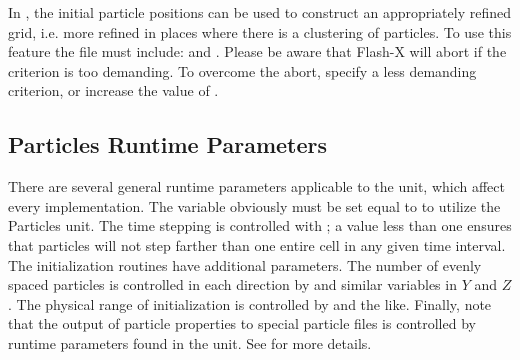 In \flashx, the initial particle positions can be used to
construct an appropriately refined grid, i.e. more refined in places
where there is a clustering of particles.  To use this feature the
 file must include:
 and
.  Please be aware that Flash-X
will abort if the criterion is  too demanding.  To overcome the abort,
specify a less demanding criterion, or increase the value of
.  

\subsection{Particles Runtime Parameters}
\label{Sec:Particles Runtime Parameters}

There are several general runtime
parameters applicable to the  unit, which affect every implementation.
The variable  obviously must be set equal to  to utilize
the Particles unit.  The time stepping is controlled with ;
a value less than one ensures that particles will not step farther than one entire cell in any
given  time interval.  The  initialization routines have additional parameters.
The number of evenly spaced particles is controlled in each direction by
 and similar variables in $Y$ and $Z$.
The physical range of initialization is controlled by 
and the like.
Finally, note that the output of particle properties to special particle files is controlled by
runtime parameters found in the  unit.  See  for more details.

